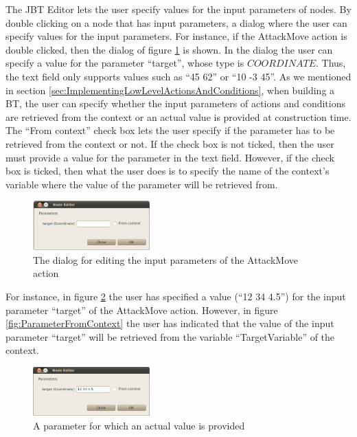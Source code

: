 \documentclass[a4paper]{article}
\begin{document}
The JBT Editor lets the user specify values for the input parameters of nodes. By double clicking on a node that has input parameters, a dialog where the user can specify values for the input parameters. For instance, if the AttackMove action is double clicked, then the dialog of figure \ref{fig:InputParameterDialog} is shown. In the dialog the user can specify a value for the parameter ``target'', whose type is $COORDINATE$. Thus, the text field only supports values such as ``45 62'' or ``10 -3 45''. As we mentioned in section \ref{sec:ImplementingLowLevelActionsAndConditions}, when building a BT, the user can specify whether the input parameters of actions and conditions are retrieved from the context or an actual value is provided at construction time. The ``From context'' check box lets the user specify if the parameter has to be retrieved from the context or not. If the check box is not ticked, then the user must provide a value for the parameter in the text field. However, if the check box is ticked, then what the user does is to specify the name of the context's variable where the value of the parameter will be retrieved from.

\begin{figure}
 \centering
 \includegraphics[width=0.4\textwidth]{./Images/InputParameterDialog.png}
 \caption{The dialog for editing the input parameters of the AttackMove action}
 \label{fig:InputParameterDialog}
\end{figure}

For instance, in figure \ref{fig:ParameterNotFromContext} the user has specified a value (``12 34 4.5'') for the input parameter ``target'' of the AttackMove action. However, in figure \ref{fig:ParameterFromContext} the user has indicated that the value of the input parameter ``target'' will be retrieved from the variable ``TargetVariable'' of the context.

\begin{figure}
 \centering
 \includegraphics[width=0.4\textwidth]{./Images/ParameterNotFromContext.png}
 \caption{A parameter for which an actual value is provided}
 \label{fig:ParameterNotFromContext}
\end{figure}
\end{document}
